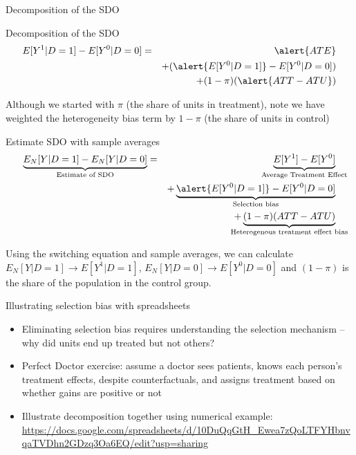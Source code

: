 \documentclass{beamer}
\begin{document}
\begin{frame}{Decomposition of the SDO}

  \begin{block}{Decomposition of the SDO}
    \begin{eqnarray*}
      E[Y^1 | D=1] - E[Y^0 | D=0]  &=& \alert{ATE} \\
      &&+ (\alert{E[Y^0|D=1]} - E[Y^0|D=0])  \\
      && + (1-\pi)(\alert{ATT - ATU})
    \end{eqnarray*}
  \end{block}
  
  \bigskip
  
Although we started with $\pi$ (the share of units in treatment), note we have weighted the heterogeneity bias term by $1-\pi$ (the share of units in control)
\end{frame}


\begin{frame}[plain]

  \begin{block}{Estimate SDO with sample averages}
    \begin{eqnarray*}
      \underbrace{E_N[Y | D=1] - E_N[Y | D=0]}_{ \mathclap{\text{Estimate of SDO}}}&=& \underbrace{E[Y^1] - E[Y^0]}_{ \mathclap{\text{Average Treatment Effect}}} \\
      &&+ \underbrace{\alert{E[Y^0|D=1]} - E[Y^0 | D=0]}_{ \mathclap{\text{Selection bias}}}  \\
      && + \underbrace{(1-\pi)(ATT - ATU)}_{ \mathclap{\text{Heterogenous treatment effect bias}}}
    \end{eqnarray*}
  \end{block}

\bigskip

Using the switching equation and sample averages, we can calculate $E_N[Y|D=1] \to E[Y^1 | D=1]$, $E_N[Y|D=0] \to E[Y^0|D=0]$ and $(1-\pi)$ is the share of the population in the control group.

\end{frame}

\begin{frame}{Illustrating selection bias with spreadsheets}
\begin{itemize}
\item Eliminating selection bias requires understanding the selection mechanism -- why did units end up treated but not others?
\item Perfect Doctor exercise: assume a doctor sees patients, knows each person's treatment effects, despite counterfactuals, and assigns treatment based on whether gains are positive or not
\item Illustrate decomposition together using numerical example: \url{https://docs.google.com/spreadsheets/d/10DuQqGtH_Ewea7zQoLTFYHbnvqaTVDhn2GDzq3Oa6EQ/edit?usp=sharing}
\end{itemize}
\end{frame}
\end{document}

